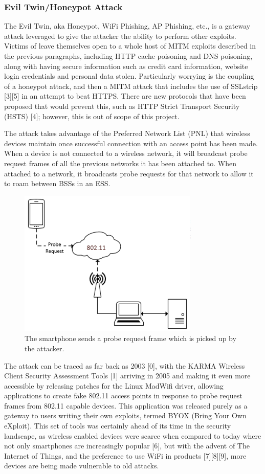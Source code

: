 \clearpage
\subsubsection{Evil Twin/Honeypot Attack}
\label{sec:honeypot}
The Evil Twin, aka Honeypot, WiFi Phishing, AP Phishing, etc., is a gateway attack leveraged to give the attacker the ability to perform other exploits. Victims of leave themselves open to a whole host of MITM exploits described in the previous paragraphs, including HTTP cache poisoning and DNS poisoning, along with having secure information such as credit card information, website login credentials and personal data stolen. Particularly worrying is the coupling of a honeypot attack, and then a MITM attack that includes the use of SSLstrip [3][5] in an attempt to beat HTTPS. There are new protocols that have been proposed that would prevent this, such as HTTP Strict Transport Security (HSTS) [4]; however, this is out of scope of this project.

The attack takes advantage of the Preferred Network List (PNL) that wireless devices maintain once successful connection with an access point has been made. When a device is not connected to a wireless network, it will broadcast probe request frames of all the previous networks it has been attached to. When attached to a network, it broadcasts probe requests for that network to allow it to roam between BSSs in an ESS. 

\begin{figure}[h!]
\centering\includegraphics{research/attackvectors/figures/honeypot.png}
\caption{The smartphone sends a probe request frame which is picked up by the attacker.}
\end{figure}

The attack can be traced as far back as 2003 [0], with the KARMA Wireless Client Security Assessment Tools [1] arriving in 2005 and making it even more accessible by releasing patches for the Linux MadWifi driver, allowing applications to create fake 802.11 access points in response to probe request frames from 802.11 capable devices. This application was released purely as a gateway to users writing their own exploits, termed BYOX (Bring Your Own eXploit). This set of tools was certainly ahead of its time in the security landscape, as wireless enabled devices were scarce when compared to today where not only smartphones are increasingly popular [6], but with the advent of The Internet of Things, and the preference to use WiFi in products [7][8][9], more devices are being made vulnerable to old attacks.  


